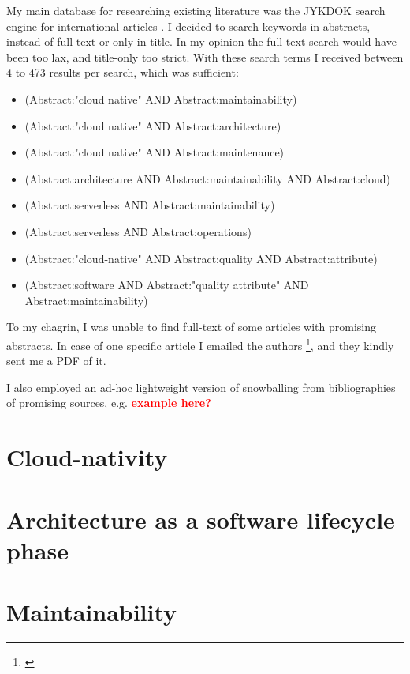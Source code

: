 \documentclass[utf8,english]{gradu3}
\newcommand{\todo}[1]{\textbf{\textcolor{red}{#1}}}
\begin{document}
My main database for researching existing literature was the JYKDOK search engine for international articles \parencite{jykdok}.
I decided to search keywords in abstracts, instead of full-text or only in title.
In my opinion the full-text search would have been too lax, and title-only too strict.
With these search terms I received between 4 to 473 results per search, which was sufficient:
\begin{itemize}
  \item (Abstract:"cloud native" AND Abstract:maintainability)
  \item (Abstract:"cloud native" AND Abstract:architecture)
  \item (Abstract:"cloud native" AND Abstract:maintenance)
  \item (Abstract:architecture AND Abstract:maintainability AND Abstract:cloud)
  \item (Abstract:serverless AND Abstract:maintainability)
  \item (Abstract:serverless AND Abstract:operations)
  \item (Abstract:"cloud-native" AND Abstract:quality AND Abstract:attribute)
  \item (Abstract:software AND Abstract:"quality attribute" AND Abstract:maintainability)
\end{itemize}

To my chagrin, I was unable to find full-text of some articles with promising abstracts.
In case of one specific article I emailed the authors \footnote{\textcite{Bogner2018}}, and they kindly sent me a PDF of it.

I also employed an ad-hoc lightweight version of snowballing from bibliographies of
promising sources, e.g. \todo{example here?}
\section{Cloud-nativity}

\section{Architecture as a software lifecycle phase}

\section{Maintainability}
\end{document}
